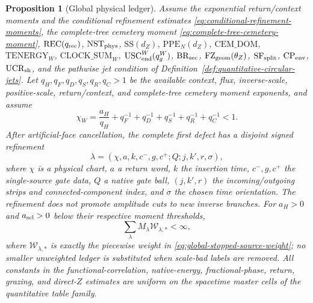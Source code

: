 \documentclass[11pt]{article}
\newtheorem{proposition}[theorem]{Proposition}
\begin{document}
\begin{proposition}[Global physical ledger]
\label{prop:global-labelled-ledger}
Assume the exponential return/context moments and the conditional refinement
estimates \eqref{eq:conditional-refinement-moments},
the complete-tree cemetery moment
\eqref{eq:complete-tree-cemetery-moment},
$\mathrm{REC}(q_{\rm rec})$,
$\mathrm{NST}_{\rm phys}$, $\mathrm{SS}(d_Z)$,
$\mathrm{PPE}_{N}(d_Z)$,
$\mathrm{CEM\_DOM}$,
$\mathrm{TENERGY}_{W}$,
$\mathrm{CLOCK\_SUM}_{W}$,
$\mathrm{USC}_{\rm end}^{W}(q_g^W)$,
$\mathrm{BR}_{\rm sec}$, $\mathrm{FZ}_{\rm geom}(\theta_Z)$,
$\mathrm{SF}_{\rm split}$, $\mathrm{CP}_{\rm env}$,
$\mathrm{UCR}_{\rm sh}$, and the pathwise jet condition of
Definition~\ref{def:quantitative-circular-jets}.  Let
$q_H,q_F,q_D,q_S,q_R,q_C>1$ be the available context, flux, inverse-scale,
positive-scale, return/context, and complete-tree cemetery moment exponents,
and assume
\begin{equation}
\label{eq:holder-conjugate-margin}
 \chi_W=\frac{a_H}{q_H}+q_F^{-1}+q_D^{-1}+q_S^{-1}+q_R^{-1}
        +q_C^{-1}<1.
\end{equation}
After artificial-face cancellation, the complete first defect has a disjoint
signed refinement
\begin{equation}
\label{eq:global-label}
 \lambda=(\chi,a,k,c^-,g,c^+;Q;j,k',r,\sigma),
\end{equation}
where $\chi$ is a physical chart, $a$ a return word, $k$ the insertion time,
$c^-,g,c^+$ the single-source gate data, $Q$ a native gate ball,
$(j,k',r)$ the incoming/outgoing strips and connected-component index, and
$\sigma$ the chosen time orientation.  The refinement does not promote
amplitude cuts to new inverse branches.  For $a_H>0$ and $a_{\rm scl}>0$
below their respective moment thresholds,
\begin{equation}
\label{eq:global-ledger-sum}
 \sum_\lambda M_\lambda\mathscr W_{\lambda,*}<\infty,
\end{equation}
where $\mathscr W_{\lambda,*}$ is exactly the piecewise weight in
\eqref{eq:global-stopped-source-weight}; no smaller unweighted ledger is substituted
when scale-bad labels are removed.
All constants in the functional-correlation, native-energy,
fractional-phase, return, grazing, and direct-$Z$ estimates are uniform on
the spacetime master cells of the quantitative table family.
\end{proposition}
\end{document}
